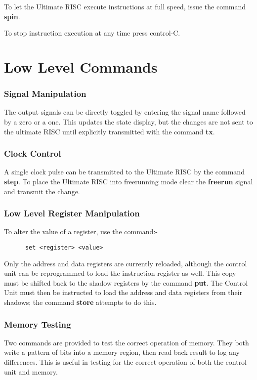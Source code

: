 To let the Ultimate RISC execute instructions at full speed, issue the command
{\bf spin}. 

To stop instruction execution at any time  press control-C.

\section{Low Level Commands}

\subsubsection{Signal Manipulation}
The output signals can be directly toggled by entering the signal name followed by a zero or a one.
This updates the state display, but the changes are not sent to the ultimate RISC until explicitly transmitted with the command {\bf tx}.

\subsubsection{Clock Control}
A single clock pulse can be transmitted to the Ultimate RISC by the command {\bf step}.
To place the Ultimate RISC into freerunning mode  clear the {\bf freerun} signal and transmit the change.

\subsubsection{Low Level  Register Manipulation}
To alter the value of a register, use the command:-
\begin{verbatim}
      set <register> <value>
\end{verbatim}
Only the address and data registers are currently reloaded, although the control unit can be reprogrammed to load the instruction register as well.
This copy must be shifted back to the shadow registers by the command {\bf put}.
The Control Unit must then be instructed to load the address and data registers from
their shadows; the command {\bf store} attempts to do this.


\subsubsection{Memory Testing}
Two commands are provided to test the correct operation of memory.
They both write a pattern of bits into a memory region, then read back result to log any differences.
This is useful in testing for the correct operation of both the control unit and memory.

